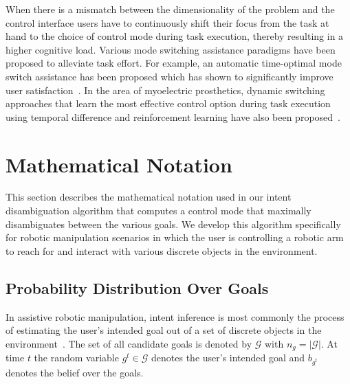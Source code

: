\documentclass[letterpaper, 10 pt, conference]{ieeeconf}  %
\begin{document}
When there is a mismatch between the dimensionality of the problem and the control interface users have to continuously shift their focus from the task at hand to the choice of control mode during task execution, thereby resulting in a higher cognitive load. Various mode switching assistance paradigms have been proposed to alleviate task effort. For example, an automatic time-optimal mode switch assistance has been proposed which has shown to significantly improve user satisfaction~\cite{herlant2016assistive}. In the area of myoelectric prosthetics, dynamic switching approaches that learn the most effective control option during task execution using temporal difference and reinforcement learning have also been proposed~\cite{pilarski2012dynamic}. 


\section{Mathematical Notation}\label{sec:math}
This section describes the mathematical notation used in our intent disambiguation algorithm that computes a control mode that maximally disambiguates between the various goals.
We develop this algorithm specifically for robotic manipulation scenarios in which the user is controlling a robotic arm to reach for and interact with various discrete objects in the environment.

\subsection{Probability Distribution Over Goals}\label{ssec:notation}
In assistive robotic manipulation, intent inference is most commonly the process of estimating the user's intended goal out of a set of discrete objects in the environment~\cite{calli2015ycb}. The set of all candidate goals is denoted by $\mathcal{G}$ with $n_g = \vert\mathcal{G}\vert$.
At time $t$ the random variable $g^t \in \mathcal{G}$ denotes the user's intended goal and $b_{g^t}$ denotes the belief over the goals. 
\end{document}
